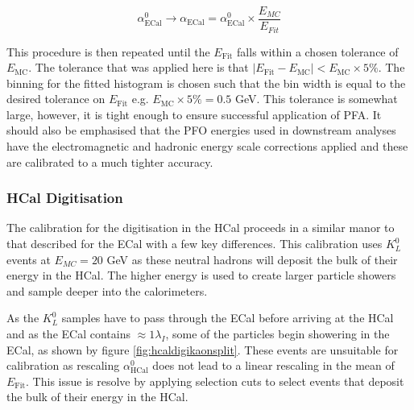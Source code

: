 \begin{equation}
\alpha^{0}_{\text{ECal}} \rightarrow \alpha_{\text{ECal}} = \alpha^{0}_{\text{ECal}} \times \frac{E_{MC}}{E_{Fit}}
\end{equation}

This procedure is then repeated until the $E_{\text{Fit}}$ falls within a chosen tolerance of $E_{\text{MC}}$.  The tolerance that was applied here is that $|E_{\text{Fit}} - E_{\text{MC}}| < E_{\text{MC}} \times 5 \%$.  The binning for the fitted histogram is chosen such that the bin width is equal to the desired tolerance on $E_{\text{Fit}}$ e.g. $E_{\text{MC}} \times 5 \% = 0.5$ GeV.  This tolerance is somewhat large, however, it is tight enough to ensure successful application of PFA.  It should also be emphasised that the PFO energies used in downstream analyses have the electromagnetic and hadronic energy scale corrections applied and these are calibrated to a much tighter accuracy.


\subsubsection{HCal Digitisation}
\label{sec:hcaldigi}
The calibration for the digitisation in the HCal proceeds in a similar manor to that described for the ECal with a few key differences.  This calibration uses $K^{0}_{L}$ events at $E_{MC} = 20$ GeV as these neutral hadrons will deposit the bulk of their energy in the HCal.  The higher energy is used to create larger particle showers and sample deeper into the calorimeters.  

As the $K^{0}_{L}$ samples have to pass through the ECal before arriving at the HCal and as the ECal contains $\approx 1 \lambda_{I}$, some of the particles begin showering in the ECal, as shown by figure \ref{fig:hcaldigikaonsplit}.  These events are unsuitable for calibration as rescaling $\alpha^{0}_{\text{HCal}}$ does not lead to a linear rescaling in the mean of $E_{\text{Fit}}$.  This issue is resolve by applying selection cuts to select events that deposit the bulk of their energy in the HCal.  

